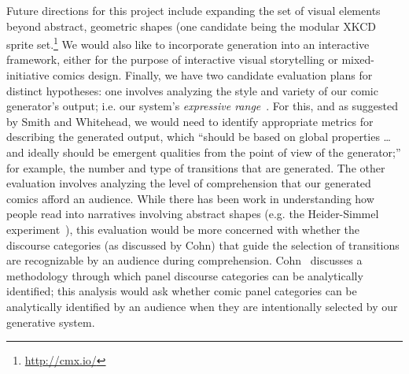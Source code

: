 Future directions for this project include expanding the set of visual
elements beyond abstract, geometric shapes (one candidate being the modular
XKCD sprite set.\footnote{\url{http://cmx.io/}}
We would also like to incorporate generation into an interactive
framework, either for the purpose of interactive visual storytelling or
mixed-initiative comics design.
%
Finally, we have two candidate evaluation plans for distinct hypotheses:
one involves analyzing the style and variety of our
comic generator's output; i.e. our system's 
\emph{expressive range}~\cite{smith2010analyzing}. For this, and as
suggested by Smith and Whitehead, we would need to identify
appropriate metrics for describing the generated output, which ``should be
based on global properties \ldots and ideally should be emergent qualities
from the point of view of the generator;'' for example, the number and type
of transitions that are generated.
%
%
The other evaluation involves analyzing the level of comprehension
that our generated comics afford an audience. While there has been work in
understanding how people read into narratives involving abstract
shapes (e.g. the Heider-Simmel experiment~\cite{heider1944experimental}),
this evaluation would be more concerned with whether the discourse
categories (as discussed by Cohn) that guide the selection of transitions
are recognizable by an audience during comprehension.
Cohn~\cite{cohn2015narrative} discusses a methodology through which panel
discourse categories can be analytically identified; this analysis would
ask whether comic panel categories can be analytically identified by an
audience when they are intentionally selected by our generative system.




